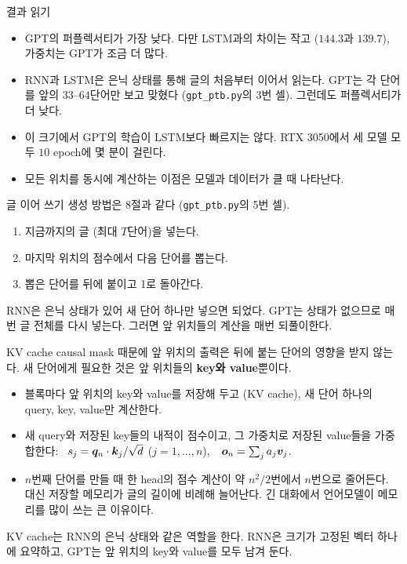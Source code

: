 \documentclass[aspectratio=169,11pt]{beamer}
\begin{document}
\begin{frame}{결과 읽기}
\begin{itemize}
\item GPT의 퍼플렉서티가 가장 낮다.
  다만 LSTM과의 차이는 작고 ($144.3$과 $139.7$), 가중치는 GPT가 조금 더 많다.
\item RNN과 LSTM은 은닉 상태를 통해 글의 처음부터 이어서 읽는다.
  GPT는 각 단어를 앞의 $33$--$64$단어만 보고 맞혔다 (\texttt{gpt\_ptb.py}의 3번 셀).
  그런데도 퍼플렉서티가 더 낮다.
\item 이 크기에서 GPT의 학습이 LSTM보다 빠르지는 않다.
  RTX 3050에서 세 모델 모두 $10$ epoch에 몇 분이 걸린다.
\item 모든 위치를 동시에 계산하는 이점은 모델과 데이터가 클 때 나타난다.
\end{itemize}
\end{frame}

\begin{frame}{글 이어 쓰기}
생성 방법은 8절과 같다 (\texttt{gpt\_ptb.py}의 5번 셀).
\begin{enumerate}
\item 지금까지의 글 (최대 $T$단어)을 넣는다.
\item 마지막 위치의 점수에서 다음 단어를 뽑는다.
\item 뽑은 단어를 뒤에 붙이고 1로 돌아간다.
\end{enumerate}
\vskip2mm
\begin{remarkbox}[RNN과 다른 점]
RNN은 은닉 상태가 있어 새 단어 하나만 넣으면 되었다.
GPT는 상태가 없으므로 매번 글 전체를 다시 넣는다.
그러면 앞 위치들의 계산을 매번 되풀이한다.
\end{remarkbox}
\end{frame}

\begin{frame}{KV cache}
causal mask 때문에 앞 위치의 출력은 뒤에 붙는 단어의 영향을 받지 않는다.
새 단어에게 필요한 것은 앞 위치들의 \textbf{key와 value}뿐이다.
\begin{itemize}
\item 블록마다 앞 위치의 key와 value를 저장해 두고 (KV cache),
  새 단어 하나의 query, key, value만 계산한다.
\item 새 query와 저장된 key들의 내적이 점수이고, 그 가중치로 저장된 value들을 가중합한다:
  \ $s_j=\bm{q}_n\cdot\bm{k}_j/\sqrt d$ ($j=1,\dots,n$),\ \ $\bm{o}_n=\sum_j a_j\bm{v}_j$.
\item $n$번째 단어를 만들 때 한 head의 점수 계산이 약 $n^2/2$번에서 $n$번으로 줄어든다.
  대신 저장할 메모리가 글의 길이에 비례해 늘어난다.
  긴 대화에서 언어모델이 메모리를 많이 쓰는 큰 이유이다.
\end{itemize}
\begin{keybox}
KV cache는 RNN의 은닉 상태와 같은 역할을 한다.
RNN은 크기가 고정된 벡터 하나에 요약하고, GPT는 앞 위치의 key와 value를 모두 남겨 둔다.
\end{keybox}
\end{frame}
\end{document}
